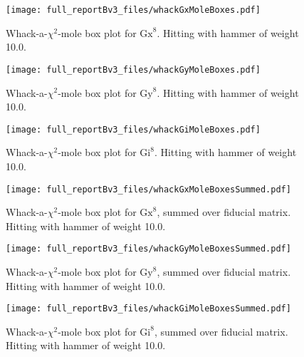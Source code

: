 {\begin{figure}
\begin{center}
\texttt{[image: full\_reportBv3\_files/whackGxMoleBoxes.pdf]}
\caption{Whack-a-$\chi^2$-mole box plot for $\mathrm{Gx}^{8}$.  Hitting with hammer of weight 10.0.\label{WhackGxMoleBoxPlot}}
\end{center}
\end{figure}

\begin{figure}
\begin{center}
\texttt{[image: full\_reportBv3\_files/whackGyMoleBoxes.pdf]}
\caption{Whack-a-$\chi^2$-mole box plot for $\mathrm{Gy}^{8}$.  Hitting with hammer of weight 10.0.\label{WhackGyMoleBoxPlot}}
\end{center}
\end{figure}

\begin{figure}
\begin{center}
\texttt{[image: full\_reportBv3\_files/whackGiMoleBoxes.pdf]}
\caption{Whack-a-$\chi^2$-mole box plot for $\mathrm{Gi}^{8}$.  Hitting with hammer of weight 10.0.\label{WhackGiMoleBoxPlot}}
\end{center}
\end{figure}

\begin{figure}
\begin{center}
\texttt{[image: full\_reportBv3\_files/whackGxMoleBoxesSummed.pdf]}
\caption{Whack-a-$\chi^2$-mole box plot for $\mathrm{Gx}^{8}$, summed over fiducial matrix.  Hitting with hammer of weight 10.0.\label{WhackGxMoleBoxPlotSummed}}
\end{center}
\end{figure}

\begin{figure}
\begin{center}
\texttt{[image: full\_reportBv3\_files/whackGyMoleBoxesSummed.pdf]}
\caption{Whack-a-$\chi^2$-mole box plot for $\mathrm{Gy}^{8}$, summed over fiducial matrix.  Hitting with hammer of weight 10.0.\label{WhackGyMoleBoxPlotSummed}}
\end{center}
\end{figure}

\begin{figure}
\begin{center}
\texttt{[image: full\_reportBv3\_files/whackGiMoleBoxesSummed.pdf]}
\caption{Whack-a-$\chi^2$-mole box plot for $\mathrm{Gi}^{8}$, summed over fiducial matrix.  Hitting with hammer of weight 10.0.\label{WhackGiMoleBoxPlotSummed}}
\end{center}
\end{figure}

}{}